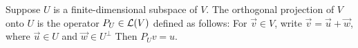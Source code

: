 \begin{definition}
Suppose $U$ is a finite-dimensional subspace of $V$. The orthogonal projection of $V$ onto $U$ is the operator $P_U \in \mathcal L(V)$ defined as follows: 
For $\vec v \in V$, write $\vec v = \vec u + \vec w$, where $\vec u \in U$ and $\vec w \in U^\perp$ Then $P_Uv = u$.
\end{definition}